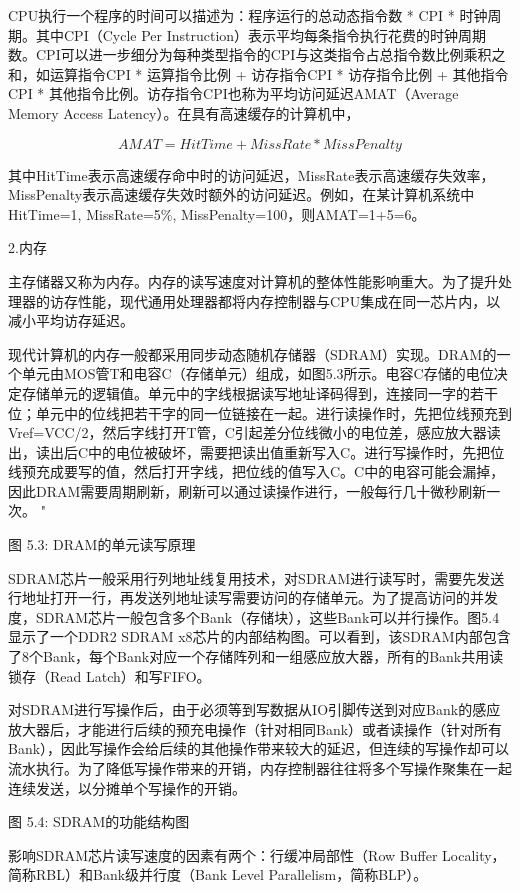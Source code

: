 \documentclass[]{ctexbook}
\begin{document}
CPU执行一个程序的时间可以描述为：程序运行的总动态指令数 * CPI * 时钟周期。其中CPI（Cycle Per Instruction）表示平均每条指令执行花费的时钟周期数。CPI可以进一步细分为每种类型指令的CPI与这类指令占总指令数比例乘积之和，如运算指令CPI * 运算指令比例 + 访存指令CPI * 访存指令比例 + 其他指令CPI * 其他指令比例。访存指令CPI也称为平均访问延迟AMAT（Average Memory Access Latency）。在具有高速缓存的计算机中，

\[AMAT = HitTime + MissRate * MissPenalty\]

其中HitTime表示高速缓存命中时的访问延迟，MissRate表示高速缓存失效率，MissPenalty表示高速缓存失效时额外的访问延迟。例如，在某计算机系统中HitTime=1, MissRate=5\%, MissPenalty=100，则AMAT=1+5=6。

2.内存

主存储器又称为内存。内存的读写速度对计算机的整体性能影响重大。为了提升处理器的访存性能，现代通用处理器都将内存控制器与CPU集成在同一芯片内，以减小平均访存延迟。

现代计算机的内存一般都采用同步动态随机存储器（SDRAM）实现。DRAM的一个单元由MOS管T和电容C（存储单元）组成，如图5.3所示。电容C存储的电位决定存储单元的逻辑值。单元中的字线根据读写地址译码得到，连接同一字的若干位；单元中的位线把若干字的同一位链接在一起。进行读操作时，先把位线预充到Vref=VCC/2，然后字线打开T管，C引起差分位线微小的电位差，感应放大器读出，读出后C中的电位被破坏，需要把读出值重新写入C。进行写操作时，先把位线预充成要写的值，然后打开字线，把位线的值写入C。C中的电容可能会漏掉，因此DRAM需要周期刷新，刷新可以通过读操作进行，一般每行几十微秒刷新一次。
"

图 5.3: DRAM的单元读写原理

SDRAM芯片一般采用行列地址线复用技术，对SDRAM进行读写时，需要先发送行地址打开一行，再发送列地址读写需要访问的存储单元。为了提高访问的并发度，SDRAM芯片一般包含多个Bank（存储块），这些Bank可以并行操作。图5.4显示了一个DDR2 SDRAM x8芯片的内部结构图。可以看到，该SDRAM内部包含了8个Bank，每个Bank对应一个存储阵列和一组感应放大器，所有的Bank共用读锁存（Read Latch）和写FIFO。

对SDRAM进行写操作后，由于必须等到写数据从IO引脚传送到对应Bank的感应放大器后，才能进行后续的预充电操作（针对相同Bank）或者读操作（针对所有Bank），因此写操作会给后续的其他操作带来较大的延迟，但连续的写操作却可以流水执行。为了降低写操作带来的开销，内存控制器往往将多个写操作聚集在一起连续发送，以分摊单个写操作的开销。

图 5.4: SDRAM的功能结构图

影响SDRAM芯片读写速度的因素有两个：行缓冲局部性（Row Buffer Locality，简称RBL）和Bank级并行度（Bank Level Parallelism，简称BLP）。
\end{document}
